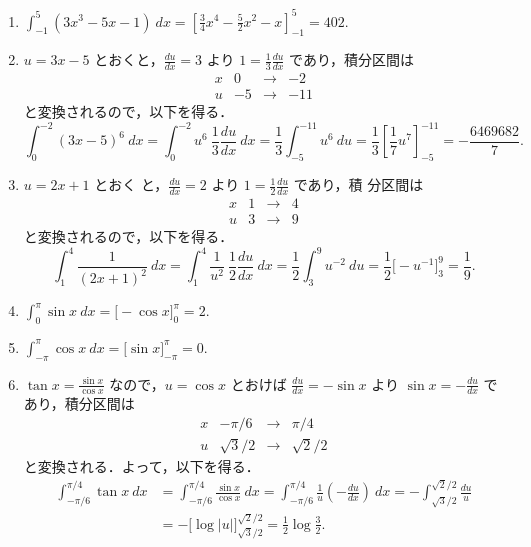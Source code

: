 \documentclass[11pt, uplatex, dvipdfmx]{jsarticle}
\newcommand{\ds}{\displaystyle}
\begin{document}
\begin{enumerate}[(1)]
  \setlength{\itemsep}{.2in}
  
  \item $\ds \int_{-1}^{5} \left( 3x^3-5x-1 \right) \ dx = \left[
      \frac{3}{4}x^4 - \frac{5}{2}x^2 - x \right]_{-1}^{5}= 402.$

  \item $u=3x-5$ とおくと，$\frac{du}{dx} = 3$ より $1=\frac{1}{3}\frac{du}{dx}$ であり，積分区間は
    \[
      \begin{array}{c|ccc}
        x & 0 & \to & -2\\ \hline
        u & -5 & \to & -11
      \end{array}
    \]
    と変換されるので，以下を得る．
    \[
      \int_{0}^{-2} \left( 3x-5 \right)^6 \ dx = \int_{0}^{-2} u^{6}\ \frac{1}{3} \frac{du}{dx} \ dx
      = \frac{1}{3} \int_{-5}^{-11} u^6 \ du = \frac{1}{3} \left[ \frac{1}{7} u^7 \right]_{-5}^{-11}
      = -\frac{6469682}{7}.
    \]
    
   \item $u=2x+1$ とおく
     と，$\frac{du}{dx}=2$ より $1=\frac{1}{2}\frac{du}{dx}$ であり，積
     分区間は
     \[
       \begin{array}{c|ccc}
         x & 1 & \to & 4\\ \hline
         u & 3 & \to & 9
       \end{array}
     \]
     と変換されるので，以下を得る．
     \[
       \int_{1}^{4} \frac{1}{(2x+1)^2} \ dx = \int_{1}^{4} \frac{1}{u^2} \ \frac{1}{2} \frac{du}{dx} \ dx
       = \frac{1}{2} \int_{3}^{9} u^{-2} \ du =\frac{1}{2} \Big[ - u^{-1} \Big]_{3}^{9} = \frac{1}{9}.
     \]

   \item $\ds \int_{0}^{\pi} \sin x \ dx =\Big[ -\cos x \Big]_{0}^{\pi}= 2.$

   \item $\ds \int_{-\pi}^{\pi} \cos x \ dx = \Big[ \sin x \Big]_{-\pi}^{\pi} =0.$

   \item $\tan x = \frac{\sin x}{\cos x}$ なので，$u=\cos x$
     とおけば $\frac{du}{dx}=-\sin x$ より $\sin x = -\frac{du}{dx}$
     であり，積分区間は
     \[
       \begin{array}{c|ccc}
         x & -\pi/6 & \to & \pi/4\\ \hline
         u & \sqrt{3}/2 & \to & \sqrt{2}/2
       \end{array}
     \]
     と変換される．よって，以下を得る．
     \begin{align*}
       \int_{-\pi/6}^{\pi/4} \tan x \ dx  &= \int_{-\pi/6}^{\pi/4} \frac{\sin x}{\cos x} \ dx =
       \int_{-\pi/6}^{\pi/4} \frac{1}{u} \left( - \frac{du}{dx} \right) \
                                            dx = -\int_{\sqrt{3}/2}^{\sqrt{2}/2} \frac{du}{u}\\
       &= -\Big[ \log |u| \Big]_{\sqrt{3}/2}^{\sqrt{2}/2}
       =\frac{1}{2} \log \frac{3}{2}.
     \end{align*}


\end{enumerate}
\end{document}
